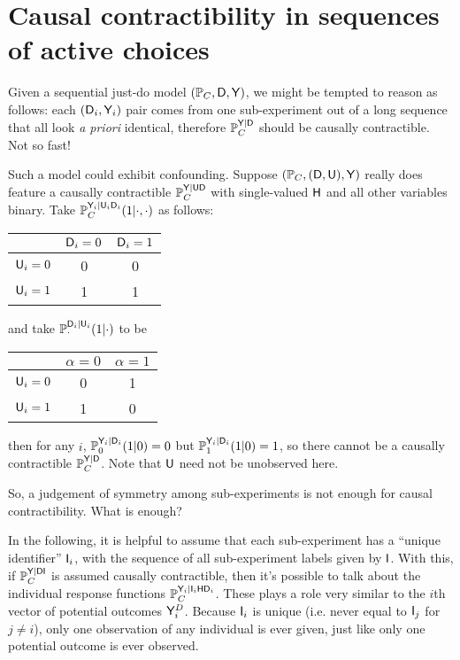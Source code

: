 \section{Causal contractibility in sequences of active choices}\label{sec:assessing}

\begin{example}[Confounding]\label{ex:confounding}
Given a sequential just-do model $(\mathbb{P}_{C},\mathsf{D},\mathsf{Y})$, we might be tempted to reason as follows: each $(\mathsf{D}_i,\mathsf{Y}_i)$ pair comes from one sub-experiment out of a long sequence that all look \emph{a priori} identical, therefore $\mathbb{P}_C^{\mathsf{Y}|\mathsf{D}}$ should be causally contractible. Not so fast!

Such a model could exhibit confounding. Suppose $(\mathbb{P}_{C},(\mathsf{D},\mathsf{U}),\mathsf{Y})$ really does feature a causally contractible $\mathbb{P}_C^{\mathsf{Y}|\mathsf{UD}}$ with single-valued $\mathsf{H}$ and all other variables binary. Take $\mathbb{P}_C^{\mathsf{Y}_i|\mathsf{U}_i\mathsf{D}_i}(1|\cdot,\cdot)$ as follows:
\begin{center}
\begin{tabular}{ c | c | c }
  & $\mathsf{D}_i=0$ & $\mathsf{D}_i=1$ \\\hline 
 $\mathsf{U}_i=0$ & 0 & 0 \\ \hline 
 $\mathsf{U}_i=1$ & 1 & 1    
\end{tabular}
\end{center}
and take $\mathbb{P}_\cdot^{\mathsf{D}_i|\mathsf{U}_i}(1|\cdot)$ to be
\begin{center}
\begin{tabular}{ c | c | c }
  & $\alpha=0$ & $\alpha=1$ \\\hline 
 $\mathsf{U}_i=0$ & 0 & 1 \\ \hline 
 $\mathsf{U}_i=1$ & 1 & 0    
\end{tabular}
\end{center}
then for any $i$, $\mathbb{P}_0^{\mathsf{Y}_i|\mathsf{D}_i}(1|0)=0$ but $\mathbb{P}_1^{\mathsf{Y}_i|\mathsf{D}_i}(1|0)=1$, so there cannot be a causally contractible $\mathbb{P}_C^{\mathsf{Y}|\mathsf{D}}$. Note that $\mathsf{U}$ need not be unobserved here.
\end{example}

So, a judgement of symmetry among sub-experiments is not enough for causal contractibility. What is enough?

In the following, it is helpful to assume that each sub-experiment has a ``unique identifier'' $\mathsf{I}_i$, with the sequence of all sub-experiment labels given by $\mathsf{I}$. With this, if $\mathbb{P}_C^{\mathsf{Y}|\mathsf{DI}}$ is assumed causally contractible, then it's possible to talk about the individual response functions $\mathbb{P}_C^{\mathsf{Y}_i|\mathsf{I}_i\mathsf{H}\mathsf{D}_i}$. These plays a role very similar to the $i$th vector of potential outcomes $\mathsf{Y}^D_i$. Because $\mathsf{I}_i$ is unique (i.e. never equal to $\mathsf{I}_j$ for $j\neq i$), only one observation of any individual is ever given, just like only one potential outcome is ever observed.

